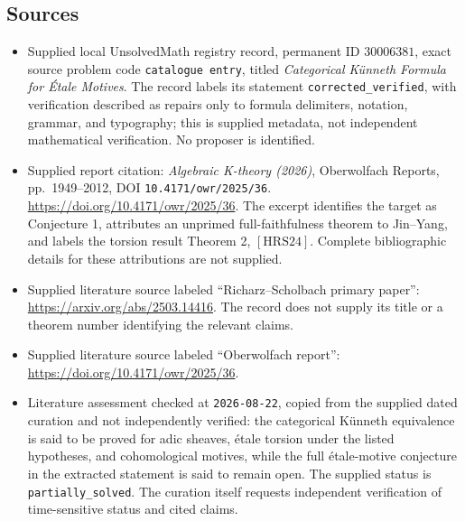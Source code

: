 \documentclass[11pt]{article}
\begin{document}
\subsection{Sources}
\begin{itemize}
\item Supplied local UnsolvedMath registry record, permanent ID \(30006381\), exact source problem code \texttt{catalogue entry}, titled \emph{Categorical Künneth Formula for Étale Motives}. The record labels its statement \texttt{corrected\_verified}, with verification described as repairs only to formula delimiters, notation, grammar, and typography; this is supplied metadata, not independent mathematical verification. No proposer is identified.
\item Supplied report citation: \emph{Algebraic K-theory (2026)}, Oberwolfach Reports, pp.\ 1949--2012, DOI \texttt{10.4171/owr/2025/36}. \url{https://doi.org/10.4171/owr/2025/36}. The excerpt identifies the target as Conjecture 1, attributes an unprimed full-faithfulness theorem to Jin--Yang, and labels the torsion result Theorem 2, \([\mathrm{HRS24}]\). Complete bibliographic details for these attributions are not supplied.
\item Supplied literature source labeled ``Richarz--Scholbach primary paper'': \url{https://arxiv.org/abs/2503.14416}. The record does not supply its title or a theorem number identifying the relevant claims.
\item Supplied literature source labeled ``Oberwolfach report'': \url{https://doi.org/10.4171/owr/2025/36}.
\item Literature assessment checked at \texttt{2026-08-22}, copied from the supplied dated curation and not independently verified: the categorical Künneth equivalence is said to be proved for adic sheaves, étale torsion under the listed hypotheses, and cohomological motives, while the full étale-motive conjecture in the extracted statement is said to remain open. The supplied status is \texttt{partially\_solved}. The curation itself requests independent verification of time-sensitive status and cited claims.
\end{itemize}
\end{document}
